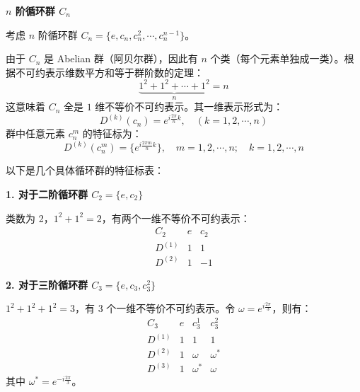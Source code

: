 \begin{example}
    \textbf{$n$ 阶循环群 $C_n$}
    
    考虑 $n$ 阶循环群 $C_n = \{e, c_n, c_n^2, \cdots, c_n^{n-1}\}$。
    
    由于 $C_n$ 是 Abelian 群（阿贝尔群），因此有 $n$ 个类（每个元素单独成一类）。根据不可约表示维数平方和等于群阶数的定理：
    \begin{equation}
        \underbrace{1^2 + 1^2 + \cdots + 1^2}_{n} = n
    \end{equation}
    这意味着 $C_n$ 全是 $1$ 维不等价不可约表示。其一维表示形式为：
    \begin{equation}
        D^{(k)}(c_n) = e^{i \frac{2\pi}{n} k}, \quad (k=1, 2, \cdots, n)
    \end{equation}
    群中任意元素 $c_n^m$ 的特征标为：
    \begin{equation}
        D^{(k)}(c_n^m) = \{ e^{i \frac{2\pi m}{n} k} \}, \quad m=1, 2, \cdots, n; \quad k=1, 2, \cdots, n
    \end{equation}
    
    以下是几个具体循环群的特征标表：
    
    \textbf{1. 对于二阶循环群 $C_2 = \{e, c_2\}$}
    
    类数为 2，$1^2 + 1^2 = 2$，有两个一维不等价不可约表示：
    \begin{equation}
        \begin{array}{c|cc}
            C_2 & e & c_2 \\
            \hline
            D^{(1)} & 1 & 1 \\
            D^{(2)} & 1 & -1
        \end{array}
    \end{equation}
    
    \textbf{2. 对于三阶循环群 $C_3 = \{e, c_3, c_3^2\}$}
    
    $1^2 + 1^2 + 1^2 = 3$，有 3 个一维不等价不可约表示。令 $\omega = e^{i \frac{2\pi}{3}}$，则有：
    \begin{equation}
        \begin{array}{c|ccc}
            C_3 & e & c_3^1 & c_3^2 \\
            \hline
            D^{(1)} & 1 & 1 & 1 \\
            D^{(2)} & 1 & \omega & \omega^* \\
            D^{(3)} & 1 & \omega^* & \omega
        \end{array}
    \end{equation}
    其中 $\omega^* = e^{-i \frac{2\pi}{3}}$。
    

\end{example}
